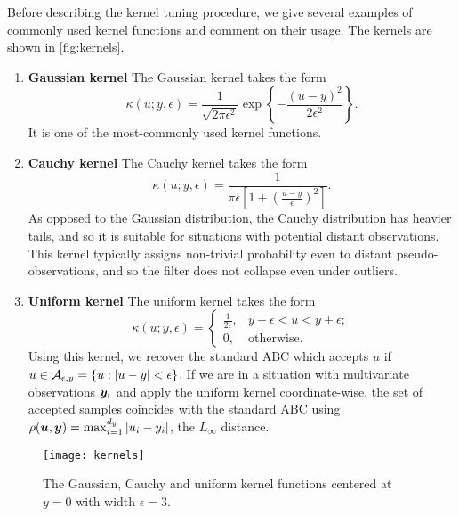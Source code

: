 Before describing the kernel tuning procedure, we give several examples of commonly used kernel functions and comment on their usage. The kernels are shown in \autoref{fig:kernels}.
\begin{enumerate}
    \item \textbf{Gaussian kernel} The Gaussian kernel takes the form
    \begin{equation*}
    \kappa(u; y, \epsilon) = \frac{1}{\sqrt{2 \pi \epsilon^2}} \exp \left\{-\frac{\left(u - y\right)^2}{2 \epsilon^2}\right\}.
    \end{equation*}
    It is one of the most-commonly used kernel functions.
    \item \textbf{Cauchy  kernel} The Cauchy kernel takes the form
    \begin{equation*}
    \kappa(u; y, \epsilon) = \frac{1}{\pi \epsilon \left[ 1 + \left(\frac{u - y}{\epsilon}\right)^2 \right]}.
    \end{equation*}
    As opposed to the Gaussian distribution, the Cauchy distribution has heavier tails, and so it is suitable for situations with potential distant observations. This kernel typically assigns non-trivial probability even to distant pseudo-observations, and so the filter does not collapse even under outliers.
    
    \item \textbf{Uniform kernel} The uniform kernel takes the form
    \begin{equation*}
    \kappa(u; y, \epsilon) = \begin{cases}
    \frac{1}{2 \epsilon}, & y - \epsilon < u < y + \epsilon; \\
    0, & \text{otherwise}.
    \end{cases}
    \end{equation*}
    Using this kernel, we recover the standard ABC which accepts $u$ if $u \in \mathcal{A}_{\epsilon, y} = \left\{u : \left| u - y \right| < \epsilon \right\}$. If we are in a situation with multivariate observations $\bm{y}_t$ and apply the uniform kernel coordinate-wise, the set of accepted samples coincides with the standard ABC using $\rho(\bm{u}, \bm{y}) = \max_{i=1}^{d_y} \left|u_i - y_i\right|$, the $L_\infty$ distance.
\end{enumerate}

\begin{figure}[ht]
    \centering
    \texttt{[image: kernels]}
    \caption{The Gaussian, Cauchy and uniform kernel functions centered at $y = 0$ with width $\epsilon = 3$.}
    \label{fig:kernels}
\end{figure}


